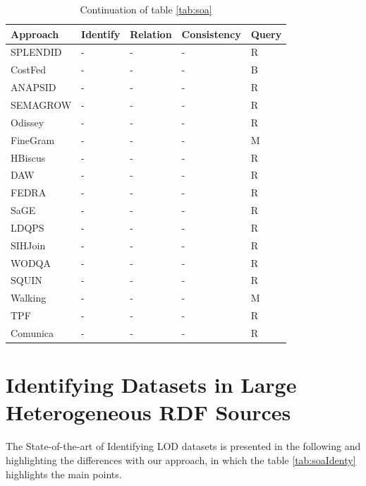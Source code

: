\begin{table}[H]
\caption{Continuation of table \ref{tab:soa}}
\label{tab:soa2}
\begin{center}
\begin{tabular}{@{}lllll@{}}
\toprule
\textbf{Approach} & \textbf{Identify} & \textbf{Relation} & \textbf{Consistency} & \textbf{Query} \\ \midrule
SPLENDID\cite{splendid2011} & - & - & - & R \\
CostFed\cite{saleem2018costfed} & - & - & - & B \\
ANAPSID\cite{anapsid2011} & - & - & - & R \\
SEMAGROW\cite{semagrow2015} & - & - & - & R \\
Odissey\cite{odyssey2017} & - & - & - & R \\
FineGram\cite{saleem2015fine} & - & - & - & M \\
HBiscus\cite{hibiscus2014} & - & - & - & R \\
DAW\cite{daw2013} & - & - & - & R \\
FEDRA\cite{fedra2015} & - & - & - & R \\
SaGE\cite{DBLP:journals/corr/abs-1806-00227} & - & - & - & R \\
LDQPS\cite{ldqp2010} & - & - & - & R \\
SIHJoin\cite{sihjoin2011} & - & - & - & R \\
WODQA\cite{wodqa2012} & - & - & - & R \\
SQUIN\cite{hartig2013squin} & - & - & - & R \\
Walking\cite{hartig2016walking} & - & - & - & M \\
TPF\cite{verborgh2016triple} & - & - & - & R \\
Comunica\cite{taelman2018comunica} & - & - & - & R \\
\bottomrule
\end{tabular}
\end{center}
\end{table}


\section{Identifying Datasets in Large Heterogeneous RDF Sources}
The State-of-the-art of Identifying LOD datasets is presented in the following and highlighting the differences with our approach, in which the table \ref{tab:soaIdenty} highlights the main points.

